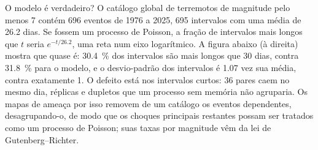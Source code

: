 O modelo é verdadeiro? O catálogo global de terremotos de magnitude pelo menos 7 contém 696 eventos
de 1976 a 2025, 695 intervalos com uma média de 26.2 dias. Se fossem um processo de Poisson,
a fração de intervalos mais longos que $t$ seria $e^{-t/26.2}$, uma reta num eixo
logarítmico. A figura abaixo (à direita) mostra que quase é: \qty{30.4}{\percent} dos intervalos são
mais longos que 30 dias, contra \qty{31.8}{\percent} para o modelo, e o desvio-padrão dos
intervalos é 1.07 vez sua média, contra exatamente 1. O defeito está nos intervalos curtos: 36 pares
caem no mesmo dia, réplicas e dupletos que um processo sem memória não agruparia. Os mapas de
ameaça por isso removem de um catálogo os eventos dependentes, desagrupando-o, de modo que os
choques principais restantes possam ser tratados como um processo de Poisson; suas taxas por magnitude vêm da
lei de Gutenberg--Richter.

